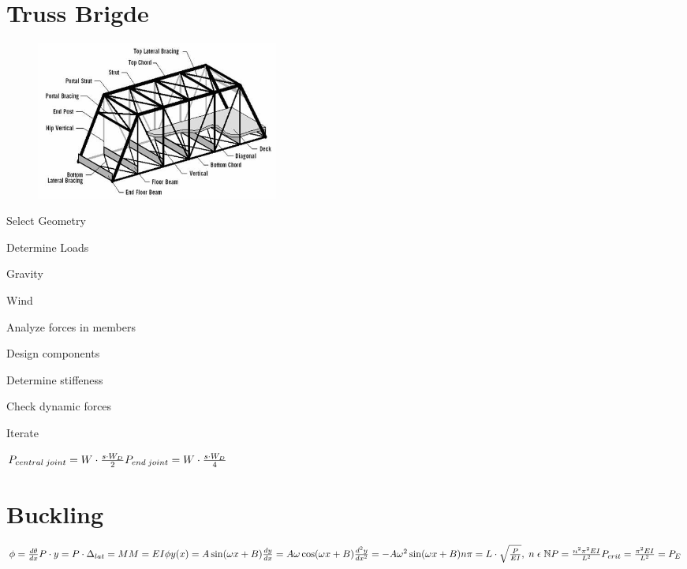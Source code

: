\documentclass{article}
\newcommand{\SubItem}[1]{
    {\setlength\itemindent{15pt} \item[-] #1}
}
\begin{document}
    \section{Truss Brigde}
        \begin{figure}[H]
            \centering
            \includegraphics[width=8cm]{TrussBridge.jpeg}
        \end{figure}
        \begin{enumerate}
            \item Select Geometry
            \item Determine Loads
                \SubItem{Gravity}
                \SubItem{Wind}
            \item Analyze forces in members
            \item Design components
            \item Determine stiffeness
            \item Check dynamic forces 
            \item Iterate
        \end{enumerate}
        \begin{math}
            P_{central\;joint}= W \cdot \frac{s\cdot W_D}{2} \\
            P_{end\;joint}= W \cdot \frac{s\cdot W_D}{4} 
        \end{math}
    
    \section{Buckling}
        \begin{math}
            \phi = \frac{d\theta}{dx} \\
            P \cdot y = P \cdot \Delta_{lat} = M\\
            M = EI\phi \\
            y(x) = A \sin(\omega x + B) \\
            \frac{dy}{dx} = A\omega \cos(\omega x +B) \\
            \frac{d^2y}{dx^2} = -A\omega^2 \sin(\omega x +B) \\
            n\pi =L\cdot \sqrt{\frac{P}{EI}},\;n\;\epsilon \;\mathbb{N}\\
            P = \frac{n^2\pi^2 E I}{L^2} \\
            P_{crit} = \frac{\pi^2 EI}{L^2} = P_E 
        \end{math}
        
        
\end{document}
